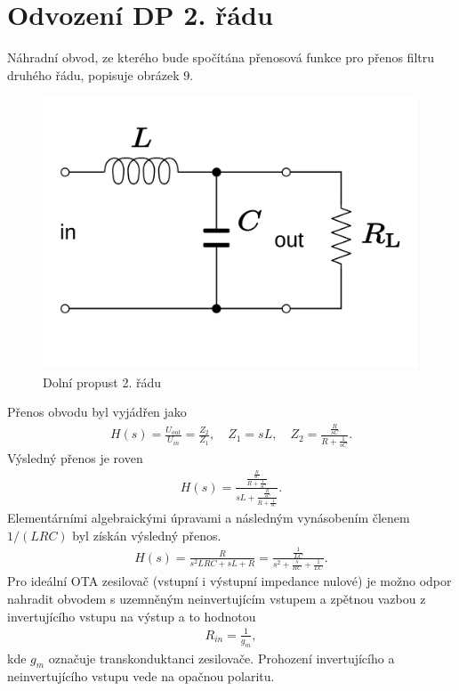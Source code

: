 \documentclass[twoside]{article}
\begin{document}
\section{Odvození DP 2. řádu}\label{sec:ODV}
Náhradní obvod, ze kterého bude spočítána přenosová funkce pro přenos filtru druhého řádu, popisuje obrázek 9.
\begin{figure}[H]
\centering
\includegraphics[scale=0.15]{RLC_low-pass.png}
\caption{Dolní propust 2. řádu \cite{7}}
\end{figure}
\noindent Přenos obvodu byl vyjádřen jako
\begin{align}
H(s) = \frac{U_{out}}{U_{in}} = \frac{Z_2}{Z_1}, \quad Z_1 = sL,\quad Z_2 = \frac{\frac{R}{sC}}{R + \frac{1}{sC}}.
\end{align}
Výsledný přenos je roven 
\begin{align}
H(s) = \frac{\frac{\frac{R}{sC}}{R + \frac{1}{sC}}}{sL + \frac{\frac{R}{sC}}{R + \frac{1}{sC}}}.
\end{align}
Elementárními algebraickými úpravami a následným vynásobením členem $1/(LRC)$ byl získán výsledný přenos.
\begin{align}
H(s) = \frac{R}{s^2LRC + sL + R} = \frac{\frac{1}{LC}}{s^2 + \frac{s}{RC} + \frac{1}{LC}}.
\end{align}
\noindent Pro ideální OTA zesilovač (vstupní i výstupní impedance nulové) je možno odpor nahradit obvodem s uzemněným neinvertujícím vstupem a zpětnou vazbou z invertujícího vstupu na výstup a to hodnotou
\begin{align}
R_{in} = \frac{1}{g_{m}},
\end{align}
kde $g_{m}$ označuje transkonduktanci zesilovače. Prohození invertujícího a neinvertujícího vstupu vede na opačnou polaritu.
\end{document}
